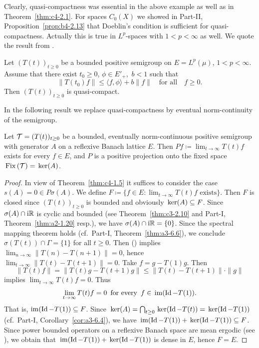Clearly, quasi-compactness was essential in the above example as well as in Theorem~\ref{thm:c4-2.1}.
For spaces $C_{0}(X)$ we showed in 
Part-II, Proposition~\ref{prop:b4-2.13} 
that Doeblin's condition is sufficient for quasi-compactness.
Actually this is true in $L^{p}$-spaces with $1 < p < \infty$ as well.
We quote the result from \textcite{lotz:1986}.
\begin{proposition}\label{prop:c4-2.4}
%
%
Let $(T(t))_{t \geq 0}$ be a bounded positive semigroup on $E = L^{p}(\mu)$, $1 < p < \infty$.
Assume that there exist $t_{0} \geq 0$, $\phi \in E'_{+}$,\, $b < 1$ such that
\begin{equation}\label{eq:c4-2.4}
\|T(t_{0})f\| \leq \langle f,\phi \rangle + b\|f\| \quad \text{for all} \quad f \geq 0.
\end{equation}
Then $(T(t))_{t \geq 0}$ is quasi-compact.
\end{proposition}
In the following result we replace quasi-compactness by eventual norm-continuity of the semigroup.
\begin{theorem} \label{thm:c4-2.5}
%
Let $\TT = (T(t))_{t \geq 0}$ be a bounded, eventually norm-continuous positive semigroup with generator $A$ on a reflexive Banach lattice $E$.
Then $Pf \coloneqq  \lim_{t \to \infty} T(t)f$ exists for every $f \in E$, and
$P$ is a positive projection onto the fixed space $\mathop{}\mathrm{Fix}\left(\mathcal{T}\right) = \mathop{}\mathrm{ker}(A)$. 
\end{theorem}
\begin{proof}
In view of Theorem~\ref{thm:c4-1.5} it suffices to consider the case $s(A) = 0 \in P{\sigma}(A)$.
We define $F \coloneqq \{f \in E \colon \lim_{t \to \infty} T(t)f \text{ exists}\}$.
Then $F$ is closed since $(T(t))_{t \geq 0}$ is bounded and obviously $\mathop{}\mathrm{ker}(A) \subseteq F$.
Since $\sigma(A) \cap \mathrm{i}\mathbb{R}$ is cyclic and bounded (see Theorem~\ref{thm:c3-2.10} and Part-I, Theorem~\ref{thm:a2-1.20} resp.), we have $\sigma(A) \cap \mathrm{i}\mathbb{R} = \{0\}$.
Since the spectral mapping theorem holds (cf.\ Part-I, Theorem~\ref{thm:a3-6.6}), we conclude $\sigma(T(t)) \cap \Gamma = \{1\}$ for all $t \geq 0$.
Then () implies $\lim_{n \to \infty} \|T(n) - T(n+1)\| = 0$, hence $\lim_{t \to \infty}\|T(t) - T(t+1)\| = 0$.
Take $f = g - T(1)g$.
Then 
%
\[
	\|T(t)f\| = \|T(t)g - T(t+1)g\| \leq \|T(t) - T(t+1)\| \cdot \|g\|
\]
%
implies $\lim_{t \to \infty} T(t)f = 0$.
Thus
\begin{equation}\label{eq:c4-2.5}
\lim_{t \to \infty} T(t)f = 0\, \text{ for every }\, f \in \mathop{}\mathrm{im}(\operatorname{Id} - T(1)).
\end{equation}
That is, $\mathrm{im}(\operatorname{Id} - T(1)) \subseteq F$.
Since $\Kern{A} = \bigcap_{t \geq 0} \Kern{\Id - T(t)} = \Kern{\Id - T(1)}$ (cf.\ Part-I, Corollary~\ref{cor:a3-6.4}), we have $\mathop{}\mathrm{im}(\operatorname{Id} - T(1)) + \mathop{}\mathrm{ker}(\operatorname{Id} - T(1)) \subseteq F$.
Since power bounded operators on a reflexive Banach space are mean ergodic (\eg  see \textcite[Chapter~2, Theorem~1.2]{krengel:1985}), we obtain that $\mathop{}\mathrm{im}(\operatorname{Id} - T(1)) + \mathop{}\mathrm{ker}(\operatorname{Id} - T(1))$ is dense in $E$, hence $F = E$.
\end{proof}

